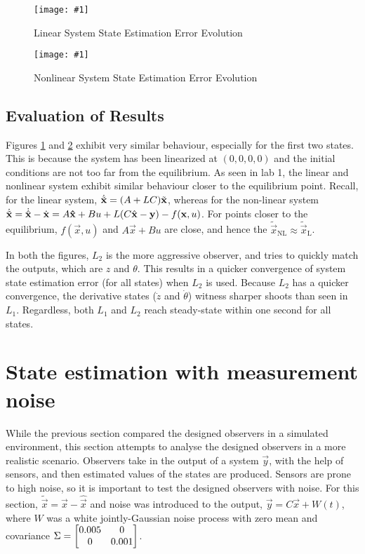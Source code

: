 \documentclass[10pt]{article}
\newcommand{\shrinkimage}[1]{\texttt{[image: \#1]}}
\begin{document}
\begin{figure}[hbt!]
    \centering
    \shrinkimage{lab4/figs/lin_noiseless_state_est_error.pdf}
    \caption{Linear System State Estimation Error Evolution}
    \label{fig:lin_noiseless_state_est_error}
\end{figure}

\begin{figure}[hbt!]
    \centering
    \shrinkimage{lab4/figs/nlin_noiseless_state_est_error.pdf}
    \caption{Nonlinear System State Estimation Error Evolution}
    \label{fig:nlin_noiseless_state_est_error}
\end{figure}

\subsection{Evaluation of Results}
Figures \ref{fig:lin_noiseless_state_est_error} and \ref{fig:nlin_noiseless_state_est_error} exhibit very similar behaviour, especially for the first two states. This is because the system has been linearized at $(0, 0, 0, 0)$ and the initial conditions are not too far from the equilibrium. As seen in lab 1, the linear and nonlinear system exhibit similar behaviour closer to the equilibrium point. Recall, for the linear system, $\dot{\Tilde{\vec{x}}} = (A+LC)\Tilde{\vec{x}}$, whereas for the non-linear system $\dot{\Tilde{\vec{x}}} = \dot{\hat{\vec{x}}} - \dot{\vec{x}} = A\vec{\hat{\vec{x}}} + Bu + L(C\hat{\vec{x}} - \vec{y}) - f(\vec{x}, u)$. For points closer to the equilibrium, $f(\vec{x}, u)$ and $A\vec{x} + Bu$ are close, and hence the $\tilde{\vec{x}}_\text{NL} \approx \tilde{\vec{x}}_\text{L}$.

In both the figures, $L_2$ is the more aggressive observer, and tries to quickly match the outputs, which are $z$ and $\theta$. This results in a quicker convergence of system state estimation error (for all states) when $L_2$ is used. Because $L_2$ has a quicker convergence, the derivative states ($\dot{z}$ and $\dot{\theta}$) witness sharper shoots than seen in $L_1$. Regardless, both $L_1$ and $L_2$ reach steady-state within one second for all states. 


\section{State estimation with measurement noise}
While the previous section compared the designed observers in a simulated environment, this section attempts to analyse the designed observers in a more realistic scenario. Observers take in the output of a system $\vec{y}$, with the help of sensors, and then estimated values of the states are produced. Sensors are prone to high noise, so it is important to test the designed observers with noise. For this section, $\tilde{\vec{x}} = \vec{x} - \hat{\vec{x}}$ and noise was introduced to the output, $\vec{y} = C\vec{x} + W(t)$, where $W$ was a white jointly-Gaussian noise process with zero mean and covariance $\Sigma = \rcvec{0.005 & 0\\0 & 0.001}$.
\end{document}
